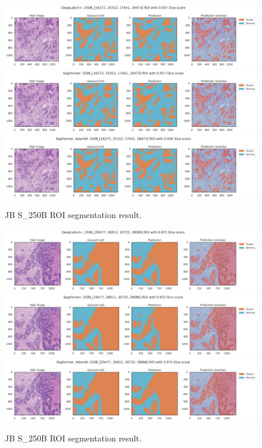 \begin{figure}[H]
\includegraphics[width=\linewidth]{figures/tissue/deeplabv3+_dice_s_250B_[16272,_25312,_17441,_26473]_check.png}
\includegraphics[width=\linewidth]{figures/tissue/segformer_dice_s_250B_[16272,_25312,_17441,_26473]_check.png}
\includegraphics[width=\linewidth]{figures/tissue/segformer,_adamw_dice_s_250B_[16272,_25312,_17441,_26473]_check.png}

\caption{JB S\_250B ROI segmentation result.}
\label{fig:s_250B_1}
\end{figure}

\begin{figure}[H]
\includegraphics[width=\linewidth]{figures/tissue/deeplabv3+_dice_s_250B_[29477,_26912,_30725,_28086]_check.png}
\includegraphics[width=\linewidth]{figures/tissue/segformer_dice_s_250B_[29477,_26912,_30725,_28086]_check.png}
\includegraphics[width=\linewidth]{figures/tissue/segformer,_adamw_dice_s_250B_[29477,_26912,_30725,_28086]_check.png}

\caption{JB S\_250B ROI segmentation result.}
\label{fig:s_250B_2}
\end{figure}

